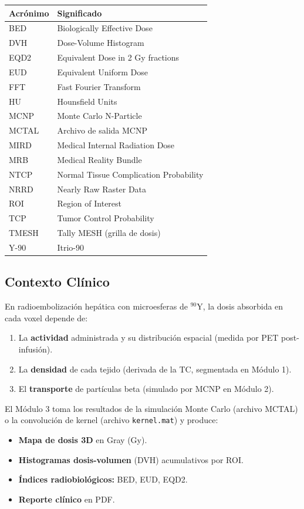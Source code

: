 \documentclass[12pt,a4paper]{article}
\begin{document}
\begin{tabular}{p{3cm} p{12cm}}
\toprule
\textbf{Acrónimo} & \textbf{Significado} \\
\midrule
BED & Biologically Effective Dose \\
DVH & Dose-Volume Histogram \\
EQD2 & Equivalent Dose in 2 Gy fractions \\
EUD & Equivalent Uniform Dose \\
FFT & Fast Fourier Transform \\
HU & Hounsfield Units \\
MCNP & Monte Carlo N-Particle \\
MCTAL & Archivo de salida MCNP \\
MIRD & Medical Internal Radiation Dose \\
MRB & Medical Reality Bundle \\
NTCP & Normal Tissue Complication Probability \\
NRRD & Nearly Raw Raster Data \\
ROI & Region of Interest \\
TCP & Tumor Control Probability \\
TMESH & Tally MESH (grilla de dosis) \\
Y-90 & Itrio-90 \\
\bottomrule
\end{tabular}

\subsection{Contexto Clínico}

En radioembolización hepática con microesferas de $^{90}$Y, la dosis absorbida en cada voxel depende de:

\begin{enumerate}
  \item La \textbf{actividad} administrada y su distribución espacial (medida por PET post-infusión).
  \item La \textbf{densidad} de cada tejido (derivada de la TC, segmentada en Módulo 1).
  \item El \textbf{transporte} de partículas beta (simulado por MCNP en Módulo 2).
\end{enumerate}

El Módulo 3 toma los resultados de la simulación Monte Carlo (archivo MCTAL) o la convolución de kernel (archivo \texttt{kernel.mat}) y produce:

\begin{itemize}
  \item \textbf{Mapa de dosis 3D} en Gray (Gy).
  \item \textbf{Histogramas dosis-volumen} (DVH) acumulativos por ROI.
  \item \textbf{Índices radiobiológicos:} BED, EUD, EQD2.
  \item \textbf{Reporte clínico} en PDF.
\end{itemize}
\end{document}
